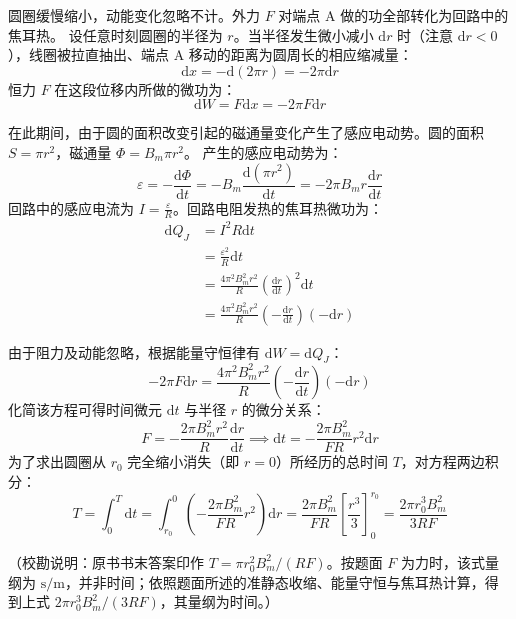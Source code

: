 \begin{solution}
圆圈缓慢缩小，动能变化忽略不计。外力 $F$ 对端点 A 做的功全部转化为回路中的焦耳热。
设任意时刻圆圈的半径为 $r$。当半径发生微小减小 $\mathrm{d}r$ 时（注意 $\mathrm{d}r < 0$），线圈被拉直抽出、端点 A 移动的距离为圆周长的相应缩减量：
$$ \mathrm{d}x = -\mathrm{d}(2\pi r) = -2\pi \mathrm{d}r $$
恒力 $F$ 在这段位移内所做的微功为：
$$ \mathrm{d}W = F \mathrm{d}x = -2\pi F \mathrm{d}r $$

在此期间，由于圆的面积改变引起的磁通量变化产生了感应电动势。圆的面积 $S = \pi r^2$，磁通量 $\Phi = B_m \pi r^2$。
产生的感应电动势为：
$$ \varepsilon = -\frac{\mathrm{d}\Phi}{\mathrm{d}t} = -B_m \frac{\mathrm{d}(\pi r^2)}{\mathrm{d}t} = -2\pi B_m r \frac{\mathrm{d}r}{\mathrm{d}t} $$
回路中的感应电流为 $I = \frac{\varepsilon}{R}$。回路电阻发热的焦耳热微功为：
\[
\begin{aligned}
\mathrm{d}Q_J &= I^2 R \mathrm{d}t\\
  &= \frac{\varepsilon^2}{R} \mathrm{d}t\\
  &= \frac{4\pi^2 B_m^2 r^2}{R} \left(\frac{\mathrm{d}r}{\mathrm{d}t}\right)^2 \mathrm{d}t\\
  &= \frac{4\pi^2 B_m^2 r^2}{R} \left(-\frac{\mathrm{d}r}{\mathrm{d}t}\right) (-\mathrm{d}r)
\end{aligned}
\]

由于阻力及动能忽略，根据能量守恒律有 $\mathrm{d}W = \mathrm{d}Q_J$：
$$ -2\pi F \mathrm{d}r = \frac{4\pi^2 B_m^2 r^2}{R} \left( -\frac{\mathrm{d}r}{\mathrm{d}t} \right) (-\mathrm{d}r) $$
化简该方程可得时间微元 $\mathrm{d}t$ 与半径 $r$ 的微分关系：
$$ F = -\frac{2\pi B_m^2 r^2}{R} \frac{\mathrm{d}r}{\mathrm{d}t} \implies \mathrm{d}t = -\frac{2\pi B_m^2}{F R} r^2 \mathrm{d}r $$
为了求出圆圈从 $r_0$ 完全缩小消失（即 $r=0$）所经历的总时间 $T$，对方程两边积分：
$$ T = \int_0^T \mathrm{d}t = \int_{r_0}^0 \left( -\frac{2\pi B_m^2}{F R} r^2 \right) \mathrm{d}r = \frac{2\pi B_m^2}{F R} \left[ \frac{r^3}{3} \right]_0^{r_0} = \frac{2\pi r_0^3 B_m^2}{3 R F} $$

（校勘说明：原书书末答案印作 $T=\pi r_0^2B_m^2/(RF)$。按题面 $F$ 为力时，该式量纲为 $\mathrm{s/m}$，并非时间；依照题面所述的准静态收缩、能量守恒与焦耳热计算，得到上式 $2\pi r_0^3B_m^2/(3RF)$，其量纲为时间。）
\end{solution}

